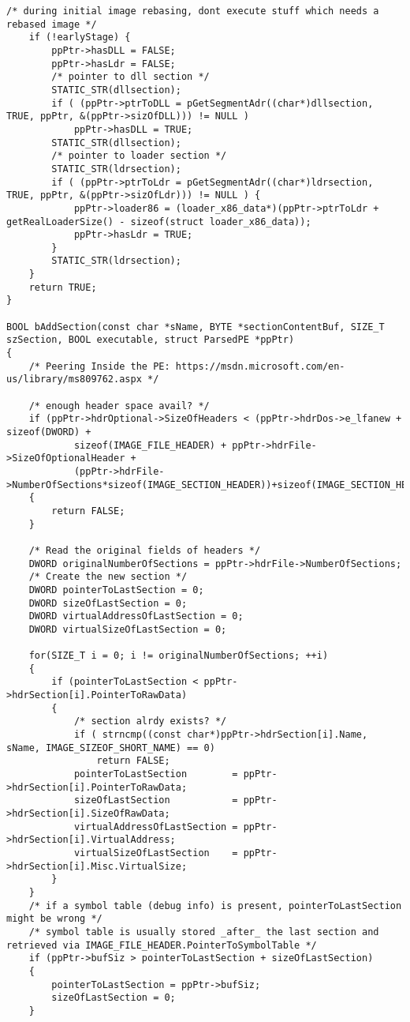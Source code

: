 \documentclass{article}
\begin{document}
\begin{lstlisting}[frame=single]
    /* during initial image rebasing, dont execute stuff which needs a rebased image */
    if (!earlyStage) {
        ppPtr->hasDLL = FALSE;
        ppPtr->hasLdr = FALSE;
        /* pointer to dll section */
        STATIC_STR(dllsection);
        if ( (ppPtr->ptrToDLL = pGetSegmentAdr((char*)dllsection, TRUE, ppPtr, &(ppPtr->sizOfDLL))) != NULL )
            ppPtr->hasDLL = TRUE;
        STATIC_STR(dllsection);
        /* pointer to loader section */
        STATIC_STR(ldrsection);
        if ( (ppPtr->ptrToLdr = pGetSegmentAdr((char*)ldrsection, TRUE, ppPtr, &(ppPtr->sizOfLdr))) != NULL ) {
            ppPtr->loader86 = (loader_x86_data*)(ppPtr->ptrToLdr + getRealLoaderSize() - sizeof(struct loader_x86_data));
            ppPtr->hasLdr = TRUE;
        }
        STATIC_STR(ldrsection);
    }
    return TRUE;
}

BOOL bAddSection(const char *sName, BYTE *sectionContentBuf, SIZE_T szSection, BOOL executable, struct ParsedPE *ppPtr)
{
    /* Peering Inside the PE: https://msdn.microsoft.com/en-us/library/ms809762.aspx */

    /* enough header space avail? */
    if (ppPtr->hdrOptional->SizeOfHeaders < (ppPtr->hdrDos->e_lfanew + sizeof(DWORD) +
            sizeof(IMAGE_FILE_HEADER) + ppPtr->hdrFile->SizeOfOptionalHeader +
            (ppPtr->hdrFile->NumberOfSections*sizeof(IMAGE_SECTION_HEADER))+sizeof(IMAGE_SECTION_HEADER)))
    {
        return FALSE;
    }

    /* Read the original fields of headers */
    DWORD originalNumberOfSections = ppPtr->hdrFile->NumberOfSections;
    /* Create the new section */
    DWORD pointerToLastSection = 0;
    DWORD sizeOfLastSection = 0;
    DWORD virtualAddressOfLastSection = 0;
    DWORD virtualSizeOfLastSection = 0;

    for(SIZE_T i = 0; i != originalNumberOfSections; ++i)
    {
        if (pointerToLastSection < ppPtr->hdrSection[i].PointerToRawData)
        {
            /* section alrdy exists? */
            if ( strncmp((const char*)ppPtr->hdrSection[i].Name, sName, IMAGE_SIZEOF_SHORT_NAME) == 0)
                return FALSE;
            pointerToLastSection        = ppPtr->hdrSection[i].PointerToRawData;
            sizeOfLastSection           = ppPtr->hdrSection[i].SizeOfRawData;
            virtualAddressOfLastSection = ppPtr->hdrSection[i].VirtualAddress;
            virtualSizeOfLastSection    = ppPtr->hdrSection[i].Misc.VirtualSize;
        }
    }
    /* if a symbol table (debug info) is present, pointerToLastSection might be wrong */
    /* symbol table is usually stored _after_ the last section and retrieved via IMAGE_FILE_HEADER.PointerToSymbolTable */
    if (ppPtr->bufSiz > pointerToLastSection + sizeOfLastSection)
    {
        pointerToLastSection = ppPtr->bufSiz;
        sizeOfLastSection = 0;
    }


\end{lstlisting}
\end{document}
